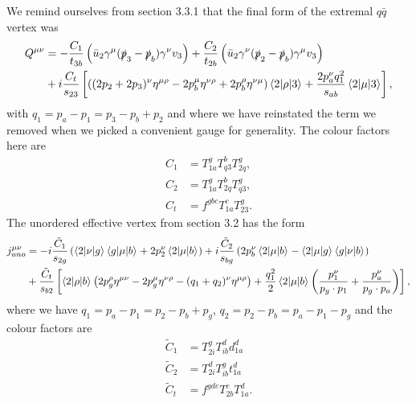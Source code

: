 We remind ourselves from section 3.3.1 that the final form of the extremal $q\bar{q}$ vertex was 
\begin{equation}
\begin{split}
Q^{\mu \nu} &= -\frac{C_1}{t_{3b}} \left(\bar{u}_2 \gamma^\mu (\slashed{p}_3-\slashed{p}_b)\gamma^\nu v_3 \right) + \frac{C_2}{t_{2b}} \left( \bar{u}_2 \gamma^\nu (\slashed{p}_2-\slashed{p}_b) \gamma^\mu v_3 \right)  \\
&+ i  \frac{C_t}{s_{23}} \left[\left((2p_2+2p_3)^\nu \eta^{\mu \rho} - 2p_b^\mu \eta^{\nu \rho} + 2p_b^\rho \eta^{\nu \mu} \right) \mathinner{\langle2\vert\rho\vert3\rangle}_{} + \frac{2 p_a^\nu q_1^2}{s_{ab}} \mathinner{\langle2\vert\mu\vert3\rangle}_{} \right],
\end{split}
\end{equation}
with $q_1 = p_a - p_1 = p_3 - p_b + p_2$ and where we have reinstated the term we removed when we picked a convenient gauge for generality. The colour factors here are
\begin{equation}
\begin{split}
C_1 &= T^g_{1a} T^b_{q3}T^g_{2q}, \\
C_2 &= T^g_{1a} T^b_{2q}T^g_{q3}, \\
C_t &= f^{gbc}T^c_{1a}T^g_{23}.
\end{split}
\end{equation}
The unordered effective vertex from section 3.2 has the form
\begin{equation}
\begin{split}
j_{uno}^{\mu \nu} &= -i \frac{\tilde{C}_1}{s_{2g}} \left(\mathinner{\langle2\vert\nu\vert g\rangle}_{}\mathinner{\langle g\vert\mu\vert b\rangle}_{} + 2p_2^\nu \mathinner{\langle2\vert\mu\vert b\rangle}_{} \right) + i \frac{\tilde{C}_2}{s_{bg}} \left(2p_b^\nu \mathinner{\langle2\vert\mu\vert b\rangle}_{} - \mathinner{\langle2\vert\mu\vert g\rangle}_{} \mathinner{\langle g\vert\nu\vert b\rangle}_{} \right) \\
&+ \frac{\tilde{C}_t}{s_{b2}} \left[\mathinner{\langle2\vert\rho\vert b\rangle}_{} \left(2p_g^\rho \eta^{\mu \nu} - 2 p_g^\mu \eta^{\nu \rho} - (q_1 + q_2)^\nu \eta^{\mu \rho} \right) + \frac{q_1^2}{2} \mathinner{\langle2\vert\mu\vert b\rangle}_{} \left(\frac{p_1^\nu}{p_g \cdot p_1} + \frac{p_a^\nu}{p_g \cdot p_a} \right) \right],
\end{split}
\end{equation}
where we have $q_1 = p_a - p_1 = p_2 - p_b + p_g$, $q_2 = p_2 - p_b = p_a - p_1 - p_g$ and the colour factors are
\begin{equation}
\begin{split}
\tilde{C}_1 &= T_{2i}^g T_{ib}^d d^d_{1a} \\
\tilde{C}_2 &= T^d_{2i} T_{ib}^g t_{1a}^d \\
\tilde{C}_t &= f^{gde}T^e_{2b}T^d_{1a}.
\end{split}
\end{equation}
